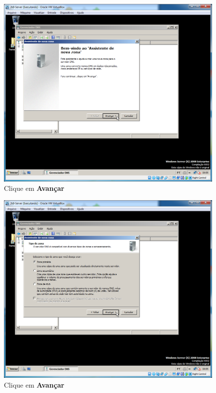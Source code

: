 \documentclass[10pt]{article}
\begin{document}
\begin{figure}[H]
    \centering
    \caption{Clique em \textbf{Avançar}}
    \label{fig:5532003}
    \includegraphics[width=\linewidth]{images/IIS/criando_um_novo_site/003.png}
\end{figure}
\begin{figure}[H]
    \centering
    \caption{Clique em \textbf{Avançar}}
    \label{fig:5532004}
    \includegraphics[width=\linewidth]{images/IIS/criando_um_novo_site/004.png}
\end{figure}
\end{document}
